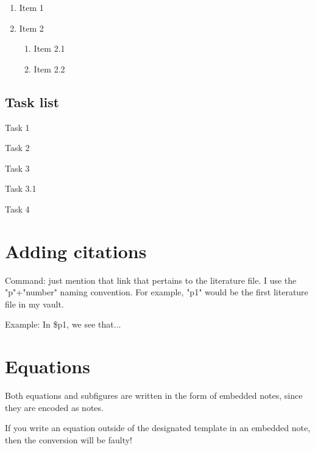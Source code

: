 \documentclass{doc_class_fontsize}{extarticle}
\begin{document}
\begin{enumerate}
\item Item 1
\item Item 2
\begin{enumerate}
\item Item 2.1
\item Item 2.2
\end{enumerate}
\end{enumerate}


\subsection{Task list}

\begin{todolist}
\item Task 1
\item Task 2
\item Task 3
\begin{todolist}
\item Task 3.1
\end{todolist}
\item Task 4
\end{todolist}
\section{Adding citations} \label{sec:Adding-citations}

Command: just mention that link that pertains to the literature file. I use the "p"+"number" naming convention. For example, "p1" would be the first literature file in my vault.



Example: In \${p1}, we see that...  \hypertarget{ad3b86}{}



\section{Equations}

Both equations and subfigures are written in the form of embedded notes, since they are encoded as notes.

\begin{tcolorbox}[width=1.0\textwidth,colback={red},title={warning},outer arc=0mm,colupper=white]

If you write an equation outside of the designated template in an embedded note, then the conversion will be faulty!

\end{tcolorbox}
\end{document}

